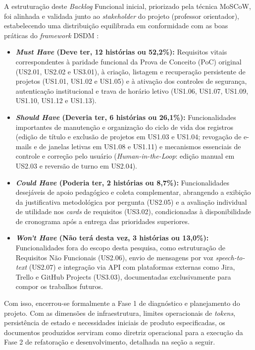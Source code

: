 A estruturação deste \textit{Backlog} Funcional inicial, priorizado pela técnica MoSCoW, foi alinhada e validada junto ao \textit{stakeholder} do projeto (professor orientador), estabelecendo uma distribuição equilibrada em conformidade com as boas práticas do \textit{framework} DSDM \cite{agilebusiness2014}:

\begin{itemize}
    \item \textbf{\textit{Must Have} (Deve ter, 12 histórias ou 52,2\%):} Requisitos vitais correspondentes à paridade funcional da Prova de Conceito (PoC) original (US2.01, US2.02 e US3.01), à criação, listagem e recuperação persistente de projetos (US1.01, US1.02 e US1.05) e à ativação dos controles de segurança, autenticação institucional e trava de horário letivo (US1.06, US1.07, US1.09, US1.10, US1.12 e US1.13).
    \item \textbf{\textit{Should Have} (Deveria ter, 6 histórias ou 26,1\%):} Funcionalidades importantes de manutenção e organização do ciclo de vida dos registros (edição de título e exclusão de projetos em US1.03 e US1.04; revogação de e-mails e de janelas letivas em US1.08 e US1.11) e mecanismos essenciais de controle e correção pelo usuário (\textit{Human-in-the-Loop}: edição manual em US2.03 e reversão de turno em US2.04).
    \item \textbf{\textit{Could Have} (Poderia ter, 2 histórias ou 8,7\%):} Funcionalidades desejáveis de apoio pedagógico e coleta complementar, abrangendo a exibição da justificativa metodológica por pergunta (US2.05) e a avaliação individual de utilidade nos \textit{cards} de requisitos (US3.02), condicionadas à disponibilidade de cronograma após a entrega das prioridades superiores.
    \item \textbf{\textit{Won't Have} (Não terá desta vez, 3 histórias ou 13,0\%):} Funcionalidades fora do escopo desta pesquisa, como estruturação de Requisitos Não Funcionais (US2.06), envio de mensagens por voz \textit{speech-to-text} (US2.07) e integração via API com plataformas externas como Jira, Trello e GitHub Projects (US3.03), documentadas exclusivamente para compor os trabalhos futuros.
\end{itemize}

Com isso, encerrou-se formalmente a Fase 1 de diagnóstico e planejamento do projeto. Com as dimensões de infraestrutura, limites operacionais de \textit{tokens}, persistência de estado e necessidades iniciais de produto especificadas, os documentos produzidos serviram como diretriz operacional para a execução da Fase 2 de refatoração e desenvolvimento, detalhada na seção a seguir.

